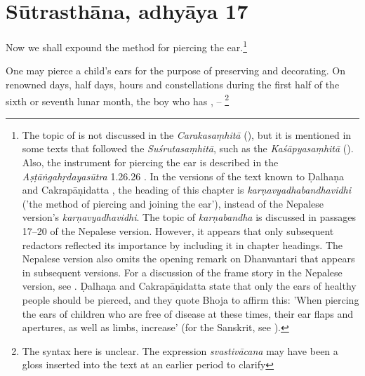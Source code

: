 
\section{Sūtrasthāna, adhyāya 17}

\begin{translation}    
    
    \item [1] Now we shall expound the method for piercing the ear.\footnote{The 
    topic of   is not discussed in the 
    \emph{Carakasaṃhitā} (\cite[IB, 326, n.\,175]{meul-hist}), but it is mentioned 
    in some texts that followed the \emph{Suśrutasaṃhitā}, such as the 
    \emph{Kaśāpyasaṃhitā} (\cite[IIA, 30]{meul-hist}). Also, the instrument for 
    piercing the ear is described in the \emph{Aṣṭāṅgahṛdayasūtra} 1.26.26 
    \citep[153]{kunt-1902}. In the versions of the text known to Ḍalhaṇa 
    \citep[76]{vulgate} and Cakrapāṇidatta \citep[125]{acar-1939}, the heading of 
    this chapter is \emph{karṇavyadhabandhavidhi} ('the method of piercing and 
    joining the ear'), instead of the Nepalese version's \emph{karṇavyadhavidhi}. 
    The topic of \emph{karṇabandha} is discussed in passages 17--20 of the 
    Nepalese version. However, it appears that only subsequent redactors reflected 
    its importance by including it in chapter headings. The Nepalese version also 
    omits the opening remark on Dhanvantari that appears in subsequent versions. 
    For a discussion of the frame story in the Nepalese version, see 
    \cite{birc-2021}. Ḍalhaṇa \citep[76]{vulgate} and Cakrapāṇidatta 
    \citep[125]{acar-1939} state that only the ears of healthy people should be 
    pierced, and they quote Bhoja to affirm this: 'When piercing the ears of children 
    who are free of disease at these times, their ear flaps and apertures, as well as 
    limbs, increase' (for the Sanskrit, see \cite[76]{vulgate}).}
    \item [2] One may pierce a child's ears for the purpose of preserving and 
    decorating. On renowned days, half days, hours and constellations during the first half of the sixth or seventh lunar month, the boy who has , -- \footnote{The
    syntax here is unclear. The expression \emph{svastivācana} may have been
    a gloss inserted into the text at an earlier period to clarify
}
\end{translation}
